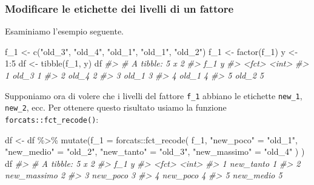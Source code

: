 \documentclass[
  11pt,
]{krantz}
\makeatletter
\newenvironment{Shaded}{\begin{snugshade}}{\end{snugshade}}
\newcommand{\AttributeTok}[1]{\textcolor[rgb]{0.61,0.61,0.61}{#1}}
\newcommand{\CommentTok}[1]{\textcolor[rgb]{0.37,0.37,0.37}{\textit{#1}}}
\newcommand{\DecValTok}[1]{\textcolor[rgb]{0.06,0.06,0.06}{#1}}
\newcommand{\FunctionTok}[1]{\textcolor[rgb]{0,0,0}{#1}}
\newcommand{\NormalTok}[1]{#1}
\newcommand{\OtherTok}[1]{\textcolor[rgb]{0.37,0.37,0.37}{#1}}
\newcommand{\SpecialCharTok}[1]{\textcolor[rgb]{0,0,0}{#1}}
\newcommand{\StringTok}[1]{\textcolor[rgb]{0.5,0.5,0.5}{#1}}
\newenvironment{kframe}{%
\medskip{}
\setlength{\fboxsep}{.8em}
 \def\at@end@of@kframe{}%
 \ifinner\ifhmode%
  \def\at@end@of@kframe{\end{minipage}}%
  \begin{minipage}{\columnwidth}%
 \fi\fi%
 \def\FrameCommand##1{\hskip\@totalleftmargin \hskip-\fboxsep
 \colorbox{shadecolor}{##1}\hskip-\fboxsep
     \hskip-\linewidth \hskip-\@totalleftmargin \hskip\columnwidth}%
 \MakeFramed {\advance\hsize-\width
   \@totalleftmargin\z@ \linewidth\hsize
   \@setminipage}}%
 {\par\unskip\endMakeFramed%
 \at@end@of@kframe}
\renewenvironment{Shaded}{\begin{kframe}}{\end{kframe}}
\theoremstyle{definition}
\theoremstyle{definition}
\theoremstyle{definition}
\theoremstyle{definition}
\theoremstyle{remark}
\makeatother
\begin{document}
\hypertarget{modificare-le-etichette-dei-livelli-di-un-fattore}{%
\subsubsection{Modificare le etichette dei livelli di un fattore}\label{modificare-le-etichette-dei-livelli-di-un-fattore}}

Esaminiamo l'esempio seguente.

\begin{Shaded}
\begin{Highlighting}[]
\NormalTok{f\_1 }\OtherTok{\textless{}{-}} \FunctionTok{c}\NormalTok{(}\StringTok{"old\_3"}\NormalTok{, }\StringTok{"old\_4"}\NormalTok{, }\StringTok{"old\_1"}\NormalTok{, }\StringTok{"old\_1"}\NormalTok{, }\StringTok{"old\_2"}\NormalTok{)}
\NormalTok{f\_1 }\OtherTok{\textless{}{-}} \FunctionTok{factor}\NormalTok{(f\_1)}
\NormalTok{y }\OtherTok{\textless{}{-}} \DecValTok{1}\SpecialCharTok{:}\DecValTok{5}
\NormalTok{df }\OtherTok{\textless{}{-}} \FunctionTok{tibble}\NormalTok{(f\_1, y)}
\NormalTok{df}
\CommentTok{\#\textgreater{} \# A tibble: 5 x 2}
\CommentTok{\#\textgreater{}   f\_1       y}
\CommentTok{\#\textgreater{}   \textless{}fct\textgreater{} \textless{}int\textgreater{}}
\CommentTok{\#\textgreater{} 1 old\_3     1}
\CommentTok{\#\textgreater{} 2 old\_4     2}
\CommentTok{\#\textgreater{} 3 old\_1     3}
\CommentTok{\#\textgreater{} 4 old\_1     4}
\CommentTok{\#\textgreater{} 5 old\_2     5}
\end{Highlighting}
\end{Shaded}

\noindent Supponiamo ora di volere che i livelli del fattore \texttt{f\_1} abbiano le etichette \texttt{new\_1}, \texttt{new\_2}, ecc. Per ottenere questo risultato usiamo la funzione \texttt{forcats::fct\_recode()}:

\begin{Shaded}
\begin{Highlighting}[]
\NormalTok{df }\OtherTok{\textless{}{-}}\NormalTok{ df }\SpecialCharTok{\%\textgreater{}\%}
  \FunctionTok{mutate}\NormalTok{(}\AttributeTok{f\_1 =}
\NormalTok{    forcats}\SpecialCharTok{::}\FunctionTok{fct\_recode}\NormalTok{(}
\NormalTok{      f\_1, }
      \StringTok{"new\_poco"} \OtherTok{=} \StringTok{"old\_1"}\NormalTok{, }
      \StringTok{"new\_medio"} \OtherTok{=} \StringTok{"old\_2"}\NormalTok{, }
      \StringTok{"new\_tanto"} \OtherTok{=} \StringTok{"old\_3"}\NormalTok{, }
      \StringTok{"new\_massimo"} \OtherTok{=} \StringTok{"old\_4"}
\NormalTok{      )}
\NormalTok{   )}
\NormalTok{df}
\CommentTok{\#\textgreater{} \# A tibble: 5 x 2}
\CommentTok{\#\textgreater{}   f\_1             y}
\CommentTok{\#\textgreater{}   \textless{}fct\textgreater{}       \textless{}int\textgreater{}}
\CommentTok{\#\textgreater{} 1 new\_tanto       1}
\CommentTok{\#\textgreater{} 2 new\_massimo     2}
\CommentTok{\#\textgreater{} 3 new\_poco        3}
\CommentTok{\#\textgreater{} 4 new\_poco        4}
\CommentTok{\#\textgreater{} 5 new\_medio       5}
\end{Highlighting}
\end{Shaded}
\end{document}
